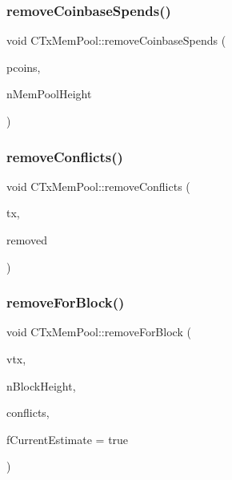 \mbox{\label{class_c_tx_mem_pool_a6d1292640d0b6028bd5c602a6a50a983}} 
\subsubsection{\texorpdfstring{remove\+Coinbase\+Spends()}{removeCoinbaseSpends()}}
{\footnotesize\ttfamily void C\+Tx\+Mem\+Pool\+::remove\+Coinbase\+Spends (\begin{DoxyParamCaption}\item[{const \mbox{\hyperlink{class_c_coins_view_cache}{C\+Coins\+View\+Cache}} $\ast$}]{pcoins,  }\item[{unsigned int}]{n\+Mem\+Pool\+Height }\end{DoxyParamCaption})}

\mbox{\label{class_c_tx_mem_pool_a11f1bddfbae7c03c6244db322876c0a7}} 
\subsubsection{\texorpdfstring{remove\+Conflicts()}{removeConflicts()}}
{\footnotesize\ttfamily void C\+Tx\+Mem\+Pool\+::remove\+Conflicts (\begin{DoxyParamCaption}\item[{const C\+Transaction \&}]{tx,  }\item[{std\+::list$<$ C\+Transaction $>$ \&}]{removed }\end{DoxyParamCaption})}

\mbox{\label{class_c_tx_mem_pool_aea14d073b24e31251465ac3c2279ee65}} 
\subsubsection{\texorpdfstring{remove\+For\+Block()}{removeForBlock()}}
{\footnotesize\ttfamily void C\+Tx\+Mem\+Pool\+::remove\+For\+Block (\begin{DoxyParamCaption}\item[{const std\+::vector$<$ C\+Transaction $>$ \&}]{vtx,  }\item[{unsigned int}]{n\+Block\+Height,  }\item[{std\+::list$<$ C\+Transaction $>$ \&}]{conflicts,  }\item[{bool}]{f\+Current\+Estimate = {\ttfamily true} }\end{DoxyParamCaption})}

